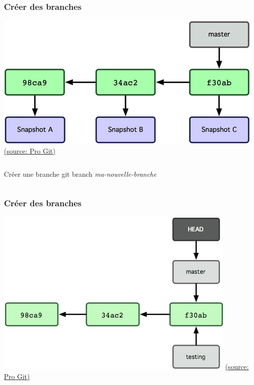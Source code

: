 \documentclass[t,11pt]{beamer}
\begin{document}
\begin{frame}
        \frametitle{Cr\'eer des branches}
        \centering
        \hspace{10mm}
        \includegraphics[width=\linewidth,height=0.4\textheight,keepaspectratio]{./img/branching_1}
        \newline
        \href{https://git-scm.com/book/fr/v1/Les-branches-avec-Git-Ce-qu-est-une-branche}{{\tiny (source: Pro Git)}}
        \begin{columns}
                \begin{block}{Cr\'eer une branche}
                        \centering
                        git branch \emph{ma-nouvelle-branche}
                \end{block}
        \end{columns}
\end{frame}

\begin{frame}
        \frametitle{Cr\'eer des branches}
        \centering
        \includegraphics[width=\linewidth,height=0.8\textheight,keepaspectratio]{./img/branching_2}
        \newline
        \href{https://git-scm.com/book/fr/v1/Les-branches-avec-Git-Ce-qu-est-une-branche}{{\tiny (source: Pro Git)}}
\end{frame}
\end{document}
